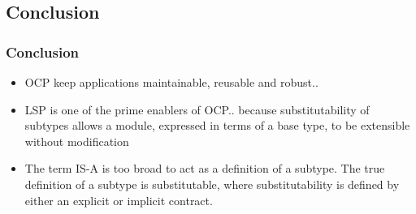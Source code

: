 \documentclass{beamer}
\begin{document}
\subsection{Conclusion}
\begin{frame}
  \frametitle{Conclusion}
  \begin{itemize}
	\item<+-> OCP keep applications maintainable, reusable and robust..
	\item<+-> LSP is one of the prime enablers of OCP.. because substitutability of subtypes allows a
module, expressed in terms of a base type, to be extensible without modification
	\item<+-> The term IS-A is too broad to act as a definition of a subtype. The true definition of a subtype is substitutable, where substitutability is defined by either an explicit or implicit contract.
   \end{itemize}
\end{frame}
\end{document}

